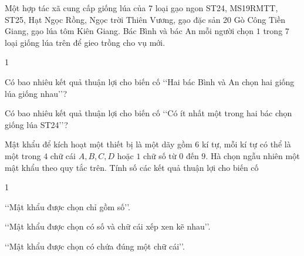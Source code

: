 \begin{bt}%
	Một hợp tác xã cung cấp giống lúa của $7$ loại gạo ngon ST24, MS19RMTT, ST25, Hạt Ngọc Rồng, Ngọc trời Thiên Vương, gạo đặc sản 20 Gò Công Tiền Giang, gạo lúa tôm Kiên Giang. Bác Bình và bác An mỗi người chọn $1$ trong $7$ loại giống lúa trên để gieo trồng cho vụ mới.
	\begin{enumEX}[a)]{1}
		\item Có bao nhiêu kết quả thuận lợi cho biến cố \lq\lq Hai bác Bình và An chọn hai giống lúa giống nhau\rq\rq?
		\item Có bao nhiêu kết quả thuận lợi cho biến cố \lq\lq Có ít nhất một trong hai bác chọn giống lúa ST24\rq\rq?
	\end{enumEX}
\end{bt}

\begin{bt}%
	Mật khẩu để kích hoạt một thiết bị là một dãy gồm $6$ kí tự, mỗi kí tự có thể là một trong $4$ chữ cái $A,B,C,D$ hoặc $1$ chữ số từ $0$ đến $9$. Hà chọn ngẫu nhiên một mật khẩu theo quy tắc trên. Tính số các kết quả thuận lợi cho biến cố
	\begin{enumEX}[a)]{1}
		\item \lq\lq Mật khẩu được chọn chỉ gồm số\rq\rq.
		\item \lq\lq Mật khẩu được chọn có số và chữ cái xếp xen kẽ nhau\rq\rq.
		\item \lq\lq Mật khẩu được chọn có chứa đúng một chữ cái\rq\rq.
	\end{enumEX}
\end{bt}

